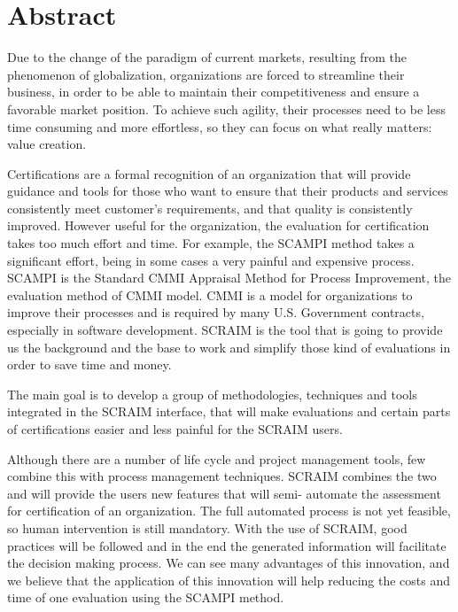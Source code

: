\chapter*{Abstract}

Due to the change of the paradigm of current markets, resulting from the phenomenon of globalization, organizations are forced to streamline their business, in order to be able to maintain their competitiveness and ensure a favorable market position. To achieve such agility, their processes need to be less time consuming and more effortless, so they can focus on what really matters: value creation.

Certifications are a formal recognition of an organization that will provide guidance and tools for those who want to ensure that their products and services consistently meet customer's requirements, and that quality is consistently improved. However useful for the organization, the evaluation for certification takes too much effort and time. For example, the SCAMPI method takes a significant effort, being in some cases a very painful and expensive process. SCAMPI is the Standard CMMI Appraisal Method for Process Improvement, the evaluation method of CMMI model. CMMI is a model for organizations to improve their processes and is required by many U.S. Government contracts, especially in software development. SCRAIM is the tool that is going to provide us the background and the base to work and simplify those kind of evaluations in order to save time and money.

The main goal is to develop a group of methodologies, techniques and tools integrated in the SCRAIM interface, that will make evaluations and certain parts of certifications easier and less painful for the SCRAIM users.

Although there are a number of life cycle and project management tools, few combine this with process management techniques. SCRAIM combines the two and will provide the users new features that will semi- automate the assessment for certification of an organization. The full automated process is not yet feasible, so human intervention is still mandatory. With the use of SCRAIM, good practices will be followed and in the end the generated information will facilitate the decision making process. We can see many advantages of this innovation, and we believe that the application of this innovation will help reducing the costs and time of one evaluation using the SCAMPI method.